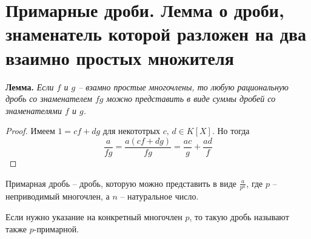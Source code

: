 \section{Примарные дроби. Лемма о дроби, знаменатель которой разложен на два взаимно простых множителя}
\textbf{Лемма.} 
\textit{Если $f$ и $g$ -- взамно простые многочлены, то любую рациональную дробь со знаменателем $fg$
можно представить в виде суммы дробей со знаменателями $f$ и $g$.}

\begin{proof}
    Имеем $1 = cf + dg$ для некототрых $c, \, d \in K[X]$. 
    Но тогда \[ \frac{a}{fg} = \frac{a(cf + dg)}{fg} = \frac{ac}{g} + \frac{ad}{f} \]
\end{proof} 

\begin{conj}
    Примарная дробь -- дробь, которую можно представить в виде $\frac{a}{p^n}$, где $p$ -- неприводимый многочлен, а $n$ -- натуральное число.
\end{conj}
Если нужно указание на конкретный многочлен $p$, то такую дробь называют также $p$-примарной.